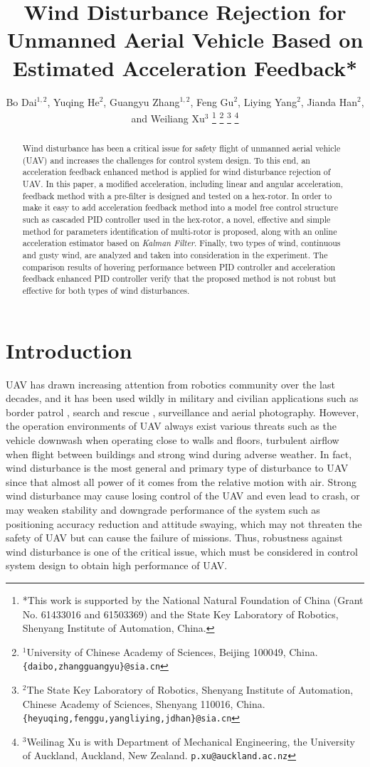 \documentclass[letterpaper, 10 pt, conference]{ieeeconf}  %
\title{\LARGE \bf
Wind Disturbance Rejection for Unmanned Aerial Vehicle Based on Estimated Acceleration Feedback*
}
\author{Bo Dai$^{1,2}$, Yuqing He$^{2}$, Guangyu Zhang$^{1,2}$, Feng Gu$^{2}$, Liying Yang$^{2}$, Jianda Han$^{2}$, and Weiliang Xu$^{3}$%
\thanks{*This work is supported by the National Natural Foundation of China (Grant No. 61433016 and 61503369) and the State Key Laboratory of Robotics, Shenyang Institute of Automation, China.}%
\thanks{$^{1}$University of Chinese Academy of Sciences, Beijing 100049, China.
    {\tt\small \{daibo,zhangguangyu\}@sia.cn}}%
\thanks{$^{2}$The State Key Laboratory of Robotics, Shenyang Institute of Automation, Chinese Academy of Sciences, Shenyang 110016, China.
    {\tt\small \{heyuqing,fenggu,yangliying,jdhan\}@sia.cn}}%
\thanks{$^{3}$Weilinag Xu is with Department of Mechanical Engineering, the University of Auckland, Auckland, New Zealand.
    {\tt\small p.xu@auckland.ac.nz}}
}
\begin{document}
\maketitle
\thispagestyle{empty}
\pagestyle{empty}


\begin{abstract}

Wind disturbance has been a critical issue for safety flight of unmanned aerial vehicle (UAV) and increases the challenges for control system design.
To this end, an acceleration feedback enhanced method is applied for wind disturbance rejection of UAV.
In this paper, a modified acceleration, including linear and angular acceleration, feedback method with a pre-filter is designed and tested on a hex-rotor.
In order to make it easy to add acceleration feedback method into a model free control structure such as cascaded PID controller used in the hex-rotor, a novel, effective and simple method for parameters identification of multi-rotor is proposed, along with an online acceleration estimator based on \textsl{Kalman Filter}.
Finally, two types of wind, continuous and gusty wind, are analyzed and taken into consideration in the experiment.
The comparison results of hovering performance between PID controller and acceleration feedback enhanced PID controller verify that the proposed method is not robust but effective for both types of wind disturbances.

\end{abstract}

\section{Introduction}

UAV has drawn increasing attention from robotics community over the last decades, and it has been used wildly in military and civilian applications such as border patrol \cite{Girard2004}, search and rescue \cite{Qi2016}, surveillance and aerial photography.
However, the operation environments of UAV always exist various threats such as the vehicle downwash when operating close to walls and floors, turbulent airflow when flight between buildings \cite{Waslander2009} and strong wind during adverse weather.
In fact, wind disturbance is the most general and primary type of disturbance to UAV since that almost all power of it comes from the relative motion with air.
Strong wind disturbance may cause losing control of the UAV and even lead to crash, or may weaken stability and downgrade performance of the system such as positioning accuracy reduction and attitude swaying, which may not threaten the safety of UAV but can cause the failure of missions.
Thus, robustness against wind disturbance is one of the critical issue, which must be considered in control system design to obtain high performance of UAV.
\end{document}
